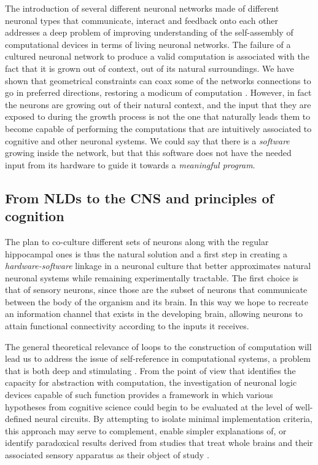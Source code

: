 The introduction of several different neuronal networks made of different neuronal types that communicate, interact and feedback onto each other addresses a deep problem of improving understanding of the self-assembly of computational devices in terms of living neuronal networks. The failure of a cultured neuronal network to produce a valid computation is associated with the fact that it is grown out of context, out of its natural surroundings. We have shown that geometrical constraints can coax some of the networks connections to go in preferred directions, restoring a modicum of computation \cite{Feinerman2008}. However, in fact the neurons are growing out of their natural context, and the input that they are exposed to during the growth process is not the one that naturally leads them to become capable of performing the computations that are intuitively associated to cognitive and other neuronal systems. We could say that there is a {\it software} growing inside the network, but that this software does not have the needed input from its hardware to guide it towards a {\it meaningful program}. 

\subsection{From NLDs to the CNS and principles of cognition}

The plan to co-culture different sets of neurons along with the regular hippocampal ones is thus the natural solution and a first step in creating a {\it hardware-software} linkage in a neuronal culture that better approximates natural neuronal systems while remaining experimentally tractable. The first choice is that of sensory neurons, since those are the subset of neurons that communicate between the body of the organism and its brain. In this way we hope to recreate an information channel that exists in the developing brain, allowing neurons to attain functional connectivity according to the inputs it receives.

The general theoretical relevance of loops to the construction of computation will lead us to address the issue of self-reference in computational systems, a problem that is both deep and stimulating \cite{Levary2012}. From the point of view that identifies the capacity for abstraction with computation, the investigation of neuronal logic devices capable of such function provides a framework in which various hypotheses from cognitive science could begin to be evaluated at the level of well-defined neural circuits. By attempting to isolate minimal implementation criteria, this approach may serve to complement, enable simpler explanations of, or identify paradoxical results derived from studies that treat whole brains and their associated sensory apparatus as their object of study \cite{McClelland2010,Griffiths2010}.

